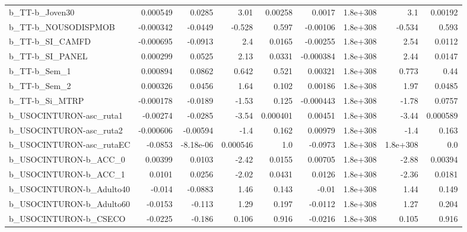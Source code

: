 \begin{tabular}{lrrrrrrrr}
b\_TT-b\_Joven30               &    0.000549 &       0.0285 &      3.01 &  0.00258 &     0.0017 &    1.8e+308 &          3.1 &       0.00192 \\
b\_TT-b\_NOUSODISPMOB          &   -0.000342 &      -0.0449 &    -0.528 &    0.597 &   -0.00106 &    1.8e+308 &       -0.534 &         0.593 \\
b\_TT-b\_SI\_CAMFD              &   -0.000695 &      -0.0913 &       2.4 &   0.0165 &   -0.00255 &    1.8e+308 &         2.54 &        0.0112 \\
b\_TT-b\_SI\_PANEL              &    0.000299 &       0.0525 &      2.13 &   0.0331 &  -0.000384 &    1.8e+308 &         2.44 &        0.0147 \\
b\_TT-b\_Sem\_1                 &    0.000894 &       0.0862 &     0.642 &    0.521 &    0.00321 &    1.8e+308 &        0.773 &          0.44 \\
b\_TT-b\_Sem\_2                 &    0.000326 &       0.0456 &      1.64 &    0.102 &    0.00186 &    1.8e+308 &         1.97 &        0.0485 \\
b\_TT-b\_Si\_MTRP               &   -0.000178 &      -0.0189 &     -1.53 &    0.125 &  -0.000443 &    1.8e+308 &        -1.78 &        0.0757 \\
b\_USOCINTURON-asc\_ruta1      &    -0.00274 &      -0.0285 &     -3.54 & 0.000401 &    0.00451 &    1.8e+308 &        -3.44 &      0.000589 \\
b\_USOCINTURON-asc\_ruta2      &   -0.000606 &     -0.00594 &      -1.4 &    0.162 &    0.00979 &    1.8e+308 &         -1.4 &         0.163 \\
b\_USOCINTURON-asc\_rutaEC     &     -0.0853 &    -8.18e-06 &  0.000546 &      1.0 &    -0.0973 &    1.8e+308 &     1.8e+308 &           0.0 \\
b\_USOCINTURON-b\_ACC\_0        &     0.00399 &       0.0103 &     -2.42 &   0.0155 &    0.00705 &    1.8e+308 &        -2.88 &       0.00394 \\
b\_USOCINTURON-b\_ACC\_1        &      0.0101 &       0.0256 &     -2.02 &   0.0431 &     0.0126 &    1.8e+308 &        -2.36 &        0.0181 \\
b\_USOCINTURON-b\_Adulto40     &      -0.014 &      -0.0883 &      1.46 &    0.143 &      -0.01 &    1.8e+308 &         1.44 &         0.149 \\
b\_USOCINTURON-b\_Adulto60     &     -0.0153 &       -0.113 &      1.29 &    0.197 &    -0.0112 &    1.8e+308 &         1.27 &         0.204 \\
b\_USOCINTURON-b\_CSECO        &     -0.0225 &       -0.186 &     0.106 &    0.916 &    -0.0216 &    1.8e+308 &        0.105 &         0.916 \\

\end{tabular}
